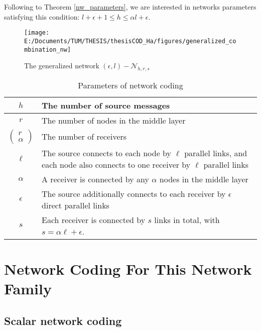 \begin{rem}
Following to Theorem \ref{nw_parameters}, we are interested in networks
parameters satisfying this condition: $l+\epsilon+1\leq h\leq\alpha l+\epsilon$.
\end{rem}
\begin{figure}[H]
\caption{The generalized network $(\epsilon,l)-\mathcal{N}_{h,r,s}$\label{fig:The-generalized-network}}

\texttt{[image: E:/Documents/TUM/THESIS/thesisCOD\_Ha/figures/generalized\_combination\_nw]}
\end{figure}

\begin{table}[H]
\caption{Parameters of network coding \label{tab:Parameters-of-network}}

\begin{tabular}{c|>{\centering}p{0.48\paperwidth}}
$h$ & The number of source messages\tabularnewline
\hline 
$r$ & The number of nodes in the middle layer\tabularnewline
\hline 
$\left(\begin{array}{c}
r\\
\alpha
\end{array}\right)$ & The number of receivers\tabularnewline
\hline 
$\ell$ & The source connects to each node by $\ell$ parallel links, and each
node also connects to one receiver by $\ell$ parallel links\tabularnewline
\hline 
$\alpha$ & A receiver is connected by any $\alpha$ nodes in the middle layer\tabularnewline
\hline 
$\epsilon$ & The source additionally connects to each receiver by $\epsilon$ direct
parallel links\tabularnewline
\hline 
$s$ & Each receiver is connected by $s$ links in total, with $s=\alpha\ell+\epsilon$.\tabularnewline
\end{tabular}
\end{table}


\section{Network Coding For This Network Family}

\subsection{Scalar network coding}

